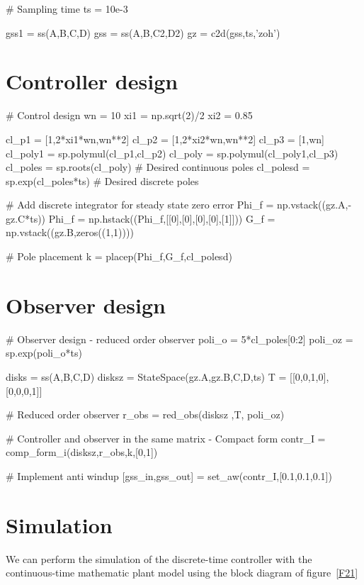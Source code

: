 \begin{code}
# Sampling time
ts = 10e-3

gss1 = ss(A,B,C,D)
gss = ss(A,B,C2,D2)
gz = c2d(gss,ts,'zoh')
\end{code}

\section{Controller design}

\begin{code}
# Control design
wn = 10
xi1 = np.sqrt(2)/2 
xi2 = 0.85 

cl_p1 = [1,2*xi1*wn,wn**2]
cl_p2 = [1,2*xi2*wn,wn**2]
cl_p3 = [1,wn]
cl_poly1 = sp.polymul(cl_p1,cl_p2)
cl_poly = sp.polymul(cl_poly1,cl_p3)
cl_poles = sp.roots(cl_poly)     # Desired continuous poles
cl_polesd = sp.exp(cl_poles*ts)  # Desired discrete poles

# Add discrete integrator for steady state zero error
Phi_f = np.vstack((gz.A,-gz.C*ts))
Phi_f = np.hstack((Phi_f,[[0],[0],[0],[0],[1]]))
G_f = np.vstack((gz.B,zeros((1,1))))

# Pole placement
k = placep(Phi_f,G_f,cl_polesd)
\end{code}

\section{Observer design}
\begin{code}
# Observer design - reduced order observer
poli_o = 5*cl_poles[0:2]
poli_oz = sp.exp(poli_o*ts) 

disks = ss(A,B,C,D)
disksz = StateSpace(gz.A,gz.B,C,D,ts)
T = [[0,0,1,0],[0,0,0,1]]

# Reduced order observer
r_obs = red_obs(disksz ,T, poli_oz)

# Controller and observer in the same matrix -  Compact form
contr_I = comp_form_i(disksz,r_obs,k,[0,1])

# Implement anti windup
[gss_in,gss_out] = set_aw(contr_I,[0.1,0.1,0.1])
\end{code}

\section{Simulation}

We can perform the simulation of the discrete-time controller with the 
continuous-time mathematic plant model using the block diagram of 
figure~\ref{F21}

